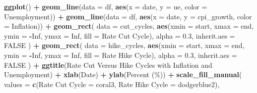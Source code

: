 \documentclass[
]{article}
\newenvironment{Shaded}{\begin{snugshade}}{\end{snugshade}}
\newcommand{\AttributeTok}[1]{\textcolor[rgb]{0.13,0.29,0.53}{#1}}
\newcommand{\ConstantTok}[1]{\textcolor[rgb]{0.56,0.35,0.01}{#1}}
\newcommand{\FloatTok}[1]{\textcolor[rgb]{0.00,0.00,0.81}{#1}}
\newcommand{\FunctionTok}[1]{\textcolor[rgb]{0.13,0.29,0.53}{\textbf{#1}}}
\newcommand{\NormalTok}[1]{#1}
\newcommand{\OtherTok}[1]{\textcolor[rgb]{0.56,0.35,0.01}{#1}}
\newcommand{\SpecialCharTok}[1]{\textcolor[rgb]{0.81,0.36,0.00}{\textbf{#1}}}
\newcommand{\StringTok}[1]{\textcolor[rgb]{0.31,0.60,0.02}{#1}}
\begin{document}
\begin{Shaded}
\begin{Highlighting}[]
\FunctionTok{ggplot}\NormalTok{() }\SpecialCharTok{+} 
  \FunctionTok{geom\_line}\NormalTok{(}\AttributeTok{data =}\NormalTok{ df, }\FunctionTok{aes}\NormalTok{(}\AttributeTok{x =}\NormalTok{ date, }\AttributeTok{y =}\NormalTok{ ue, }\AttributeTok{color =} \StringTok{\textquotesingle{}Unemployment\textquotesingle{}}\NormalTok{)) }\SpecialCharTok{+}
  \FunctionTok{geom\_line}\NormalTok{(}\AttributeTok{data =}\NormalTok{ df, }\FunctionTok{aes}\NormalTok{(}\AttributeTok{x =}\NormalTok{ date, }\AttributeTok{y =}\NormalTok{ cpi\_growth, }\AttributeTok{color =} \StringTok{\textquotesingle{}Inflation\textquotesingle{}}\NormalTok{)) }\SpecialCharTok{+}
  \FunctionTok{geom\_rect}\NormalTok{(}
    \AttributeTok{data =}\NormalTok{ cut\_cycles, }\FunctionTok{aes}\NormalTok{(}\AttributeTok{xmin =}\NormalTok{ start, }\AttributeTok{xmax =}\NormalTok{ end, }\AttributeTok{ymin =} \SpecialCharTok{{-}}\ConstantTok{Inf}\NormalTok{, }\AttributeTok{ymax =} \ConstantTok{Inf}\NormalTok{, }\AttributeTok{fill =} \StringTok{\textquotesingle{}Rate Cut Cycle\textquotesingle{}}\NormalTok{),}
    \AttributeTok{alpha =} \FloatTok{0.3}\NormalTok{, }\AttributeTok{inherit.aes =} \ConstantTok{FALSE}
\NormalTok{  ) }\SpecialCharTok{+}
  \FunctionTok{geom\_rect}\NormalTok{(}
    \AttributeTok{data =}\NormalTok{ hike\_cycles, }\FunctionTok{aes}\NormalTok{(}\AttributeTok{xmin =}\NormalTok{ start, }\AttributeTok{xmax =}\NormalTok{ end, }\AttributeTok{ymin =} \SpecialCharTok{{-}}\ConstantTok{Inf}\NormalTok{, }\AttributeTok{ymax =} \ConstantTok{Inf}\NormalTok{, }\AttributeTok{fill =} \StringTok{\textquotesingle{}Rate Hike Cycle\textquotesingle{}}\NormalTok{),}
    \AttributeTok{alpha =} \FloatTok{0.3}\NormalTok{, }\AttributeTok{inherit.aes =} \ConstantTok{FALSE}
\NormalTok{  ) }\SpecialCharTok{+}
  \FunctionTok{ggtitle}\NormalTok{(}\StringTok{\textquotesingle{}Rate Cut Versus Hike Cycles with Inflation and Unemployment\textquotesingle{}}\NormalTok{) }\SpecialCharTok{+}
  \FunctionTok{xlab}\NormalTok{(}\StringTok{\textquotesingle{}Date\textquotesingle{}}\NormalTok{) }\SpecialCharTok{+}
  \FunctionTok{ylab}\NormalTok{(}\StringTok{\textquotesingle{}Percent (\%)\textquotesingle{}}\NormalTok{) }\SpecialCharTok{+} 
  \FunctionTok{scale\_fill\_manual}\NormalTok{(}
    \AttributeTok{values =} \FunctionTok{c}\NormalTok{(}\StringTok{\textquotesingle{}Rate Cut Cycle\textquotesingle{}} \OtherTok{=} \StringTok{\textquotesingle{}coral3\textquotesingle{}}\NormalTok{, }\StringTok{\textquotesingle{}Rate Hike Cycle\textquotesingle{}} \OtherTok{=} \StringTok{\textquotesingle{}dodgerblue2\textquotesingle{}}\NormalTok{), }

\end{Highlighting}
\end{Shaded}
\end{document}
